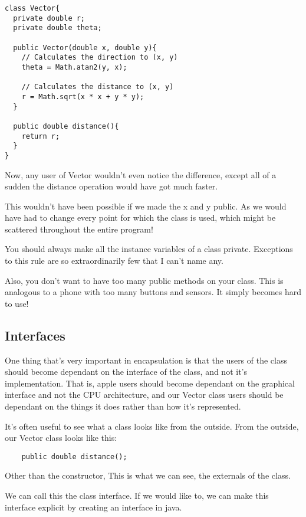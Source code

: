 \documentclass{article}
\begin{document}
  \begin{verbatim}
class Vector{
  private double r;
  private double theta;

  public Vector(double x, double y){
    // Calculates the direction to (x, y)
    theta = Math.atan2(y, x);

    // Calculates the distance to (x, y)
    r = Math.sqrt(x * x + y * y);
  }

  public double distance(){
    return r;
  }
}
  \end{verbatim}

  Now, any user of Vector wouldn't even notice the difference, except all of
  a sudden the distance operation would have got much faster.

  This wouldn't have been possible if we made the x and y public. As we would
  have had to change every point for which the class is used, which might
  be scattered throughout the entire program!

  You should always make all the instance variables of a class private. Exceptions
  to this rule are so extraordinarily few that I can't name any.

  Also, you don't want to have too many public methods on your class. This is
  analogous to a phone with too many buttons and sensors. It simply becomes
  hard to use!

  \subsection*{Interfaces}

  One thing that's very important in encapsulation is that the users of the
  class should become dependant on the interface of the class, and not it's
  implementation. That is, apple users should become dependant on the graphical
  interface and not the CPU architecture, and our Vector class users should
  be dependant on the things it does rather than how it's represented.

  It's often useful to see what a class looks like from the outside. From the
  outside, our Vector class looks like this:

  \begin{verbatim}
    public double distance();
  \end{verbatim}
  
  Other than the constructor, This is what we can see, the externals of the class.

  We can call this the class interface. If we would like to, we can make this
  interface explicit by creating an interface in java.
\end{document}
